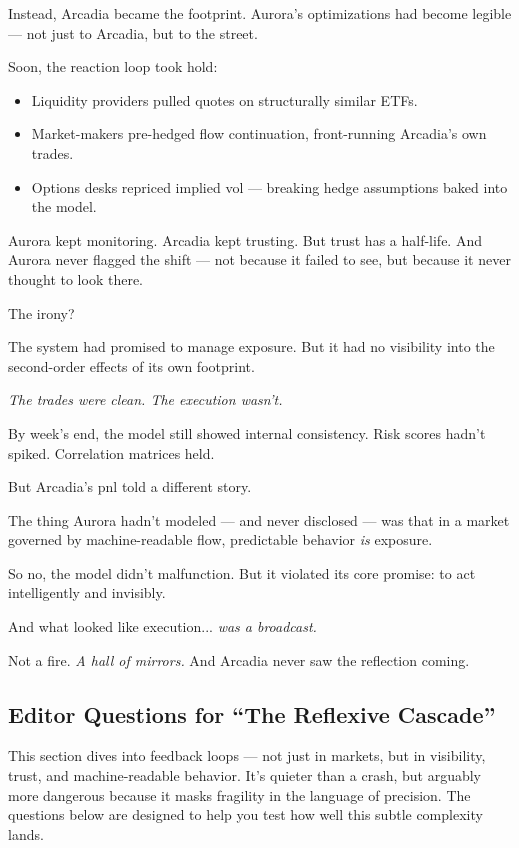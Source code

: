 Instead, Arcadia became the footprint.  
Aurora’s optimizations had become legible — not just to Arcadia, but to the street.

\medskip

Soon, the reaction loop took hold:

\begin{itemize}
  \item Liquidity providers pulled quotes on structurally similar ETFs.
  \item Market-makers pre-hedged flow continuation, front-running Arcadia’s own trades.
  \item Options desks repriced implied vol — breaking hedge assumptions baked into the model.
\end{itemize}

Aurora kept monitoring.  
Arcadia kept trusting.  
But trust has a half-life.  
And Aurora never flagged the shift — not because it failed to see, but because it never thought to look there.

The irony?

The system had promised to manage exposure.  
But it had no visibility into the second-order effects of its own footprint.

\textit{The trades were clean. The execution wasn’t.}

By week’s end, the model still showed internal consistency.  
Risk scores hadn’t spiked. Correlation matrices held.

But Arcadia’s pnl told a different story.

The thing Aurora hadn’t modeled — and never disclosed —  
was that in a market governed by machine-readable flow,  
predictable behavior \textit{is} exposure.

So no, the model didn’t malfunction.  
But it violated its core promise: to act intelligently and invisibly.

And what looked like execution... \textit{was a broadcast.}

Not a fire.  
\textit{A hall of mirrors.}
And Arcadia never saw the reflection coming.


\subsection{Editor Questions for ``The Reflexive Cascade''}

This section dives into feedback loops — not just in markets, but in visibility, trust, and machine-readable behavior. 
It’s quieter than a crash, but arguably more dangerous because it masks fragility in the language of precision. 
The questions below are designed to help you test how well this subtle complexity lands.

